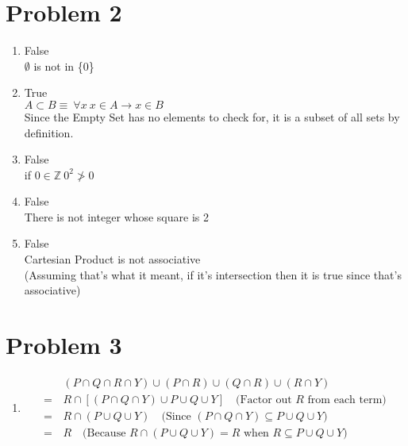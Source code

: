 \documentclass{article}
\begin{document}
\section*{Problem 2}
\begin{enumerate}
    \item %
    False \\
    $\emptyset$ is not in \{0\}
    
    \item %
    True \\
    $A \subset B \equiv \ \forall x \ x \in A \to x \in B$ \\
    Since the Empty Set has no elements to check for, it is a subset of all sets by definition.
    
    \item %
    False \\
    if $0 \in \mathbb{Z} \ 0^2 \ngtr 0$ 
    
    \item %
    False \\
    There is not integer whose square is 2
    
    \item %
    False \\
    Cartesian Product is not associative \\
    (Assuming that's what it meant, if it's intersection then it is true since that's associative)


\end{enumerate}

\section*{Problem 3}
\begin{enumerate}
    \item %
    
    \begin{align*}
    & (P \cap Q \cap R \cap Y) \cup (P \cap R) \cup (Q \cap R) \cup (R \cap Y) \\
    =\, & R \cap \left[ (P \cap Q \cap Y) \cup P \cup Q \cup Y \right] \quad \text{(Factor out } R \text{ from each term)} \\
    =\, & R \cap (P \cup Q \cup Y) \quad \text{(Since } (P \cap Q \cap Y) \subseteq P \cup Q \cup Y \text{)} \\
    =\, & R \quad \text{(Because } R \cap (P \cup Q \cup Y) = R \text{ when } R \subseteq P \cup Q \cup Y \text{)}
    \end{align*}

\end{enumerate}
\end{document}
